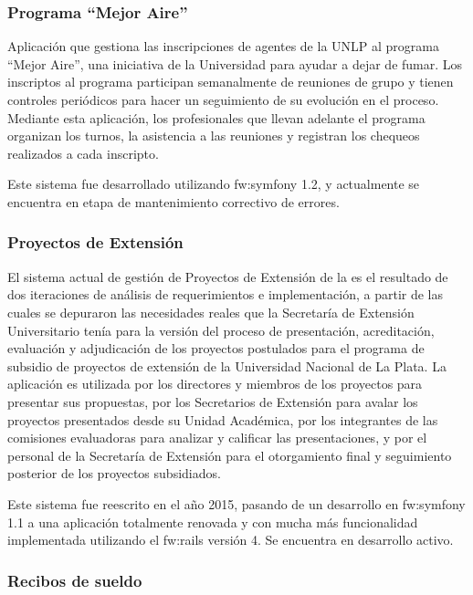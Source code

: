 \subsubsection{Programa ``Mejor Aire''}
\label{anexo:detalle-clientes:mejor-aire}

Aplicación que gestiona las inscripciones de agentes de la UNLP al programa ``Mejor Aire'', una iniciativa de la Universidad para ayudar a dejar de fumar. Los inscriptos al programa participan semanalmente de reuniones de grupo y tienen controles periódicos para hacer un seguimiento de su evolución en el proceso. Mediante esta aplicación, los profesionales que llevan adelante el programa organizan los turnos, la asistencia a las reuniones y registran los chequeos realizados a cada inscripto.

Este sistema fue desarrollado utilizando \gls{fw:symfony} 1.2, y actualmente se encuentra en etapa de mantenimiento correctivo de errores.


\subsubsection{Proyectos de Extensión}
\label{anexo:detalle-clientes:extension}

El sistema actual de gestión de Proyectos de Extensión de la {\unlp} es el resultado de dos iteraciones de análisis de requerimientos e implementación, a partir de las cuales se depuraron las necesidades reales que la Secretaría de Extensión Universitario tenía para la versión  del proceso de presentación, acreditación, evaluación y adjudicación de los proyectos postulados para el programa de subsidio de proyectos de extensión de la Universidad Nacional de La Plata. La aplicación es utilizada por los directores y miembros de los proyectos para presentar sus propuestas, por los Secretarios de Extensión para avalar los proyectos presentados desde su Unidad Académica, por los integrantes de las comisiones evaluadoras para analizar y calificar las presentaciones, y por el personal de la Secretaría de Extensión para el otorgamiento final y seguimiento posterior de los proyectos subsidiados.

Este sistema fue reescrito en el año 2015, pasando de un desarrollo en \gls{fw:symfony} 1.1 a una aplicación totalmente renovada y con mucha más funcionalidad implementada utilizando el  \gls{fw:rails} versión 4. Se encuentra en desarrollo activo.


\subsubsection{Recibos de sueldo}
\label{anexo:detalle-clientes:recibos}

